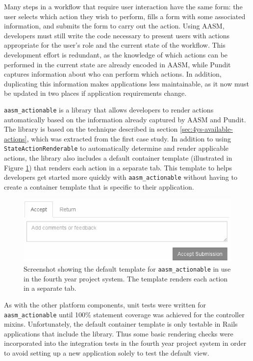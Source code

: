 \documentclass[document.tex]{subfiles}
\begin{document}
Many steps in a workflow that require user interaction have the same form: the user selects which action they wish to perform, fills a form with some associated information, and submits the form to carry out the action. Using AASM, developers must still write the code necessary to present users with actions appropriate for the user's role and the current state of the workflow. This development effort is redundant, as the knowledge of which actions can be performed in the current state are already encoded in AASM, while Pundit captures information about who can perform which actions. In addition, duplicating this information makes applications less maintainable, as it now must be updated in two places if application requirements change.

\verb!aasm_actionable! \cite{aasm_actionable} is a library that allows developers to render actions automatically based on the information already captured by AASM and Pundit. The library is based on the technique described in section \ref{sec:4ys-available-actions}, which was extracted from the first case study. In addition to using \verb!StateActionRenderable! to automatically determine and render applicable actions, the library also includes a default container template (illustrated in Figure \ref{fig:aasm-actionable-example}) that renders each action in a separate tab. This template to helps developers get started more quickly with \verb!aasm_actionable! without having to create a container template that is specific to their application.

\begin{figure}[!htbp]
  \centering
  \includegraphics[width=5in]{./img/platform/aasm-actionable-example}
  \cprotect
  \caption{Screenshot showing the default template for \verb!aasm_actionable! in use in the fourth year project system. The template renders each action in a separate tab.}
  \label{fig:aasm-actionable-example}
\end{figure}

As with the other platform components, unit tests were written for \verb!aasm_actionable! until 100\% statement coverage was achieved for the controller mixins. Unfortunately, the default container template is only testable in Rails applications that include the library. Thus some basic rendering checks were incorporated into the integration tests in the fourth year project system in order to avoid setting up a new application solely to test the default view.
\end{document}

